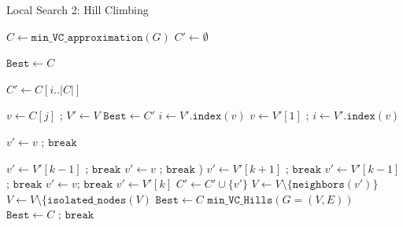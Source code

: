 \documentclass{sig-alternate-05-2015}
\begin{document}
\begin{algorithm}
\LinesNumbered
\DontPrintSemicolon
\BlankLine
 

\caption{Local Search 2: Hill Climbing}

\BlankLine
\Begin
{
	$C \leftarrow \texttt{min\_VC\_approximation}(G)$\;
	$C' \leftarrow \emptyset$\;
	
	$\texttt{Best} \leftarrow C$\;
	{
		$C' \leftarrow C [ i .. |C|]$\;
		{
			$v \leftarrow C[j]$ ; $V' \leftarrow V$\;
			{
				$\texttt{Best} \leftarrow C'$\;
			}
			{
				$i \leftarrow V'.\texttt{index}(v)$\;
			}
			{
				$v \leftarrow V'[1]$ ; $i \leftarrow V'.\texttt{index}(v)$\;
							}
			\ForAll{$k \in [i,|V'|$}
			{
				{
					$v' \leftarrow v$ ; $\texttt{break}$\;
					
				}
				{
					{
						$v' \leftarrow V'[k-1]$ ; $\texttt{break}$\;			
					}
					\Else
					{	
						$v' \leftarrow v$ ; $\texttt{break}$\;
					)
					{
						$v' \leftarrow V'[k+1]$ ; $\texttt{break}$\;				
					}
				{
					$v' \leftarrow V'[k-1]$ ; $\texttt{break}$\;					
				}
				{
					$v' \leftarrow v$; $\texttt{break}$\;
				}
				\Else
				{
					$v' \leftarrow V'[k]$\;
				}
			}
		}
		$C' \leftarrow C' \cup \lbrace v' \rbrace$\;
		$V \leftarrow V \setminus \lbrace \texttt{neighbors}(v') \rbrace$\;
		$V \leftarrow V \setminus \lbrace \texttt{isolated\_nodes}(V)$\;
		{
			{
				$\texttt{Best} \leftarrow C$\;
			}
			{
				$\texttt{min\_VC\_Hills}(G=(V,E))$\;
			}
		}
		{
			$\texttt{Best} \leftarrow C$ ; $\texttt{break}$\;
		}
	}
	}
	}
	\;
}
\end{algorithm}
\end{document}

